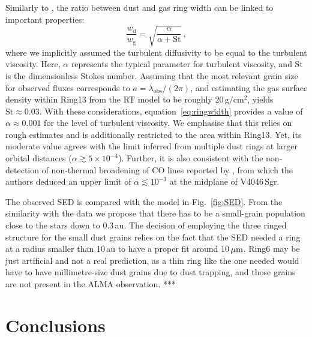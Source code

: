 \documentclass[letters,usenatbib,times]{mnras}
\begin{document}
Similarly to \citet{2018ApJ...869L..46D}, the ratio between dust and gas ring width can be linked to important properties:
\begin{equation}\label{eq:ringwidth}
        \frac{w_\mathrm{d}}{w_\mathrm{g}} = \sqrt{\frac{\alpha}{\alpha+\mathrm{St}}}\,,
\end{equation}
where we implicitly assumed the turbulent diffusivity to be equal to the turbulent viscosity. Here, $\alpha$ represents the typical parameter for turbulent viscosity, and $\mathrm{St}$ is the dimensionless Stokes number. Assuming that the most relevant grain size for observed fluxes corresponds to $a = \lambda_{\mathrm{obs}}/(2 \pi)$, and estimating the gas surface density within Ring13 from the RT model to be roughly $20\,\mathrm{g}/\mathrm{cm}^2$, yields $\mathrm{St}\approx 0.03$. With these considerations, equation~\ref{eq:ringwidth} provides a value of $\alpha \approx 0.001$ for the level of turbulent viscosity. We emphasise that this relies on rough estimates and is additionally restricted to the area within Ring13. Yet, its moderate value agrees with the limit \citet{2018ApJ...869L..46D} inferred from multiple dust rings at larger orbital distances ($\alpha \gtrsim 5\times10^{-4}$). Further, it is also consistent with the non-detection of non-thermal broadening of CO lines reported by \citet{Flaherty_2020}, from which the authors deduced an upper limit of $\alpha \lesssim 10^{-3}$ at the midplane of V4046\,Sgr.

The observed SED is compared with the model in Fig.~\ref{fig:SED}. From the similarity with the data we propose that there has to be a small-grain population close to the stars down to 0.3\,au. The decision of employing the three ringed structure for the small dust grains relies on the fact that the SED needed a ring at a radius smaller than 10\,au to have a proper fit around 10\,$\hbox{$\mu$m}$.
Ring6 may be just artificial and not a real prediction, as a thin ring like the one needed would have to have millimetre-size dust grains due to dust trapping, and those grains are not present in the ALMA observation. *** 

\section{Conclusions} \label{sec:Conclusions}
\end{document}
